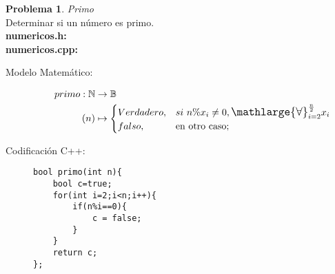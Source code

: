 \documentclass{article}
\theoremstyle{plain}
\theoremstyle{definition}
\newtheorem{problem}{Problema}
\begin{document}
\begin{problem} \emph{Primo}\\
Determinar si un número es primo.\\
\textbf{numericos.h:}\ \\
\textbf{numericos.cpp:}\ 
%
\begin{description}
\item[Modelo Matemático:]
%
\begin{align*}
primo: \mathbb{N} &\to \mathbb{B}\\
(n) &\mapsto
\begin{cases}
Verdadero,& si\ n\%x_i \not= 0, {\mathlarger{\mathlarger{\mathlarge{\forall}}}}_{i=2}^{\frac{n}{2}}x_i \\
falso,& \text{en otro caso;}
\end{cases}
\end{align*}
%
\item[Codificación \textsf{C++}:]\hfill
%
\begin{verbatim}
bool primo(int n){
    bool c=true;
    for(int i=2;i<n;i++){
        if(n%i==0){
            c = false;
        }
    }
    return c;
};
\end{verbatim}
\end{description}
\end{problem}
\end{document}
